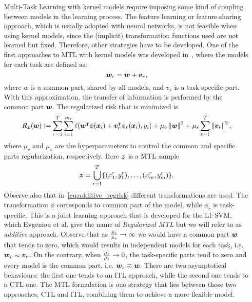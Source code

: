 Multi-Task Learning with kernel models require imposing some kind of coupling between models in the learning process. The feature learning or feature sharing approach, which is usually adopted with neural networks, is not feasible when using kernel models, since the (implicit) transformation functions used are not learned but fixed. Therefore, other strategies have to be developed. 
One of the first approaches to MTL with kernel models was developed in~\cite{EvgeniouP04}, where the models for each task are defined as:
\begin{equation}
    \nonumber
    \bm{w}_r = \bm{w} + \bm{v}_r,
\end{equation} 
where $w$ is a common part, shared by all models, and $v_r$ is a task-specific part. With this approximation, the transfer of information is performed by the common part $\bm{w}$.
The regularized risk that is minimized is 
\begin{equation}
    \label{eq:additive_regrisk}
    \risk_{\bsample} (\fv{w}) \defeq \sum_{r=1}^{\ntasks} \sum_{i=1}^{\npertask_r} \lossf(\fv{w}^\intercal {\phi(\fv{x}_i)} + \fv{v}_r^\intercal {\phi_r(\fv{x}_i)}, y_i) + \mu_c \norm{\fv{w}}^2 + \mu_s \sum_{r=1}^\ntasks \norm{\fv{v}_r}^2,
\end{equation}
where $\mu_c$ and $\mu_s$ are the hyperparameters to control the common and specific parts regularization, respectively. Here $\bm{z}$ is a MTL sample $$\bm{z} = \bigcup_{r=1}^T \{(x_1^r, y_1^r), \ldots, (x_{m}^r, y_{m}^r)\}.$$
Observe also that in~\eqref{eq:additive_regrisk} different transformations are used. The transformation $\phi$ corresponds to common part of the model, while $\phi_r$ is task-specific.
%
This is a joint learning approach that is developed for the L1-SVM, which Evgeniou et al. give the name of \emph{Regularized MTL} but we will refer to as \emph{additive} approach.
%
Observe that as $\frac{\mu_c}{\mu_s} \xrightarrow[]{} \infty $ we would have a common part $\bm{w}$ that tends to zero, which would results in independent models for each task, i.e. $\bm{w}_r \eqsim \bm{v}_r$. On the contrary, when $\frac{\mu_c}{\mu_s} \xrightarrow[]{} 0 $, the task-specific parts tend to zero and every model is the common part, i.e. $\bm{w}_r \eqsim \bm{w}$.
There are two asymptotical behaviours: the first one tends to an ITL approach, while the second one tends to a CTL one. The MTL formulation is one strategy that lies between those two approaches, CTL and ITL, combining them to achieve a more flexible model.

